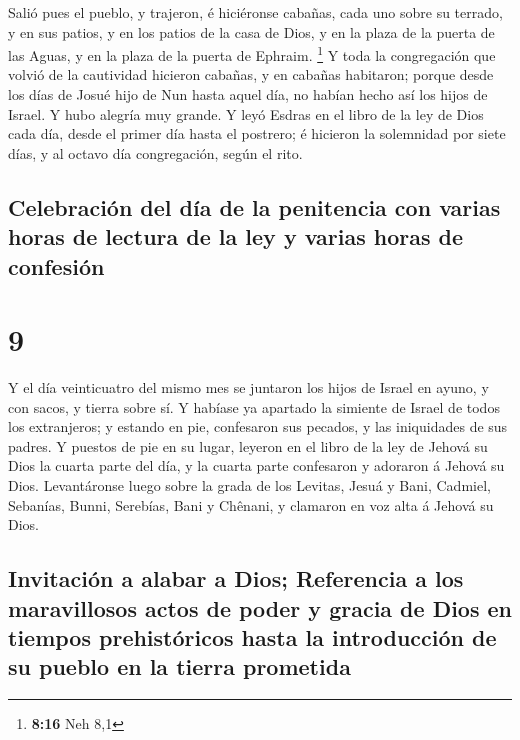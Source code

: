  Salió pues el pueblo, y trajeron, é hiciéronse cabañas,
cada uno sobre su terrado, y en sus patios, y en los patios de la casa
de Dios, y en la plaza de la puerta de las Aguas, y en la plaza de la
puerta de Ephraim. \footnote{\textbf{8:16} Neh 8,1}  Y
toda la congregación que volvió de la cautividad hicieron cabañas, y en
cabañas habitaron; porque desde los días de Josué hijo de Nun hasta
aquel día, no habían hecho así los hijos de Israel. Y hubo alegría muy
grande.  Y leyó Esdras en el libro de la ley de Dios cada
día, desde el primer día hasta el postrero; é hicieron la solemnidad por
siete días, y al octavo día congregación, según el rito.

\hypertarget{celebraciuxf3n-del-duxeda-de-la-penitencia-con-varias-horas-de-lectura-de-la-ley-y-varias-horas-de-confesiuxf3n}{%
\subsection{Celebración del día de la penitencia con varias horas de
lectura de la ley y varias horas de
confesión}\label{celebraciuxf3n-del-duxeda-de-la-penitencia-con-varias-horas-de-lectura-de-la-ley-y-varias-horas-de-confesiuxf3n}}

\hypertarget{section-8}{%
\section{9}\label{section-8}}

 Y el día veinticuatro del mismo mes se juntaron los hijos
de Israel en ayuno, y con sacos, y tierra sobre sí.  Y
habíase ya apartado la simiente de Israel de todos los extranjeros; y
estando en pie, confesaron sus pecados, y las iniquidades de sus padres.
 Y puestos de pie en su lugar, leyeron en el libro de la
ley de Jehová su Dios la cuarta parte del día, y la cuarta parte
confesaron y adoraron á Jehová su Dios.  Levantáronse
luego sobre la grada de los Levitas, Jesuá y Bani, Cadmiel, Sebanías,
Bunni, Serebías, Bani y Chênani, y clamaron en voz alta á Jehová su
Dios.

\hypertarget{invitaciuxf3n-a-alabar-a-dios-referencia-a-los-maravillosos-actos-de-poder-y-gracia-de-dios-en-tiempos-prehistuxf3ricos-hasta-la-introducciuxf3n-de-su-pueblo-en-la-tierra-prometida}{%
\subsection{Invitación a alabar a Dios; Referencia a los maravillosos
actos de poder y gracia de Dios en tiempos prehistóricos hasta la
introducción de su pueblo en la tierra
prometida}\label{invitaciuxf3n-a-alabar-a-dios-referencia-a-los-maravillosos-actos-de-poder-y-gracia-de-dios-en-tiempos-prehistuxf3ricos-hasta-la-introducciuxf3n-de-su-pueblo-en-la-tierra-prometida}}

